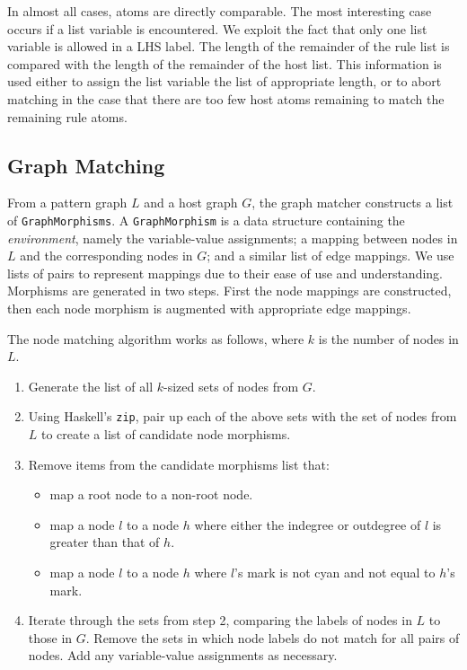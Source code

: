 In almost all cases, atoms are directly comparable. The most interesting case occurs if a list variable is encountered. We exploit the fact that only one list variable is allowed in a LHS label. The length of the remainder of the rule list is compared with the length of the remainder of the host list. This information is used either to assign the list variable the list of appropriate length, or to abort matching in the case that there are too few host atoms remaining to match the remaining rule atoms.

\subsection{Graph Matching}

From a pattern graph $L$ and a host graph $G$, the graph matcher constructs a list of \texttt{GraphMorphisms}. A \texttt{GraphMorphism} is a data structure containing the \textit{environment}, namely the variable-value assignments; a mapping between nodes in $L$ and the corresponding nodes in $G$; and a similar list of edge mappings. We use lists of pairs to represent mappings due to their ease of use and understanding. Morphisms are generated in two steps. First the node mappings are constructed, then each node morphism is augmented with appropriate edge mappings. 

The node matching algorithm works as follows, where $k$ is the number of nodes in $L$. 

\begin{enumerate}
\item Generate the list of all $k$-sized sets of nodes from $G$.
\item Using Haskell's \texttt{zip}, pair up each of the above sets with the set of nodes from $L$ to create a list of candidate node morphisms.
\item Remove items from the candidate morphisms list that:
  \begin{itemize}
  \item map a root node to a non-root node.
  \item map a node $l$ to a node $h$ where either the indegree or outdegree of $l$ is greater than that of $h$.
  \item map a node $l$ to a node $h$ where $l$'s mark is not cyan and not equal to $h$'s mark.
  \end{itemize}
\item Iterate through the sets from step 2, comparing the labels of nodes in $L$ to those in $G$. Remove the sets in which node labels do not match for all pairs of nodes. Add any variable-value assignments as necessary.
\end{enumerate}


